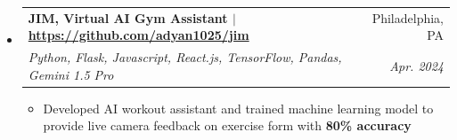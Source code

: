 \documentclass[letterpaper,10pt]{article}
\makeatletter
\newcommand{\rsection}[1]{
  \section{#1}
}
\newenvironment{rsectionlist}{
  \begin{itemize}[leftmargin=*, itemsep=0.75em, label={}]
}{
  \end{itemize}
  \vspace*{-1.5em}

}
\newcommand{\rsectionitem}[4]{
  \item \begin{tabular*}{0.98\textwidth}[t]{l@{\extracolsep{\fill}}r}
      \textbf{#1} & #2 \\
      \textit{#3} & \textit{\small #4}
    \end{tabular*}
}
\newcommand{\rsectiondesc}[1]{
  \begin{minipage}{0.98\textwidth} #1 \end{minipage}
  \vspace*{-0.25em}
}
\newenvironment{rpointlist}{
  \begin{itemize}
  \setlength{\itemsep}{0pt}
  \setlength{\parskip}{2pt}
  \setlength{\parsep}{0pt}
}{
  \end{itemize}
}
\newcommand{\rpointlone}[1]{
  \item \small{#1}
}
\newcommand{\highlight}[1]{\textbf{\small #1}}
\makeatother
\begin{document}
\begin{rsectionlist}
    \rsectionitem
      {JIM, Virtual AI Gym Assistant $|$ \faLink\hspace{0.3em}\url{https://github.com/adyan1025/jim}}
      {Philadelphia, PA}
      {Python, Flask, Javascript, React.js, TensorFlow, Pandas, Gemini 1.5 Pro}
      {\small \itshape Apr. 2024}

      \rsectiondesc{
          \begin{rpointlist}
            \rpointlone{Developed AI workout assistant and trained machine learning model to provide live camera feedback on exercise form with \highlight{80\% accuracy}}
          \end{rpointlist}
        }




        



\end{rsectionlist}
\end{document}
